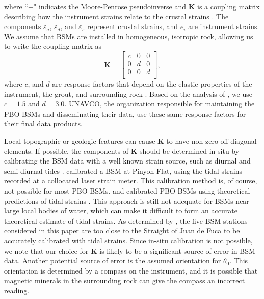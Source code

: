 where ``$+$" indicates the Moore-Penrose pseudoinverse and
$\mathbf{K}$ is a coupling matrix describing how the instrument
strains relate to the crustal strains \citep{Hart1996}. The components
$\varepsilon_a$, $\varepsilon_d$, and $\varepsilon_s$ represent
crustal strains, and $e_i$ are instrument strains. We assume that BSMs
are installed in homogeneous, isotropic rock, allowing us to write the
coupling matrix as
\begin{equation}\label{eq:CouplingMatrix}
\mathbf{K} = 
\left[\begin{array}{ccc}
c & 0 & 0 \\
0 & d & 0 \\
0 & 0 & d \\
\end{array}\right],
\end{equation}  
where $c$, and $d$ are response factors that depend on the elastic
properties of the instrument, the grout, and surrounding rock
\citep{Gladwin1985}. Based on the analysis of \citet{Gladwin1985}, we
use $c=1.5$ and $d=3.0$. UNAVCO, the organization responsible for
maintaining the PBO BSMs and disseminating their data, use these same
response factors for their final data products.

Local topographic or geologic features can cause $\mathbf{K}$ to have
non-zero off diagonal elements. If possible, the components of
$\mathbf{K}$ should be determined in-situ by calibrating the BSM data
with a well known strain source, such as diurnal and semi-diurnal
tides \citep{Hart1996,Roeloffs2010,Hodgkinson2013}. \citet{Hart1996}
calibrated a BSM at Pinyon Flat, using the tidal strains recorded at a
collocated laser strain meter. This calibration method is, of course,
not possible for most PBO BSMs. \citet{Roeloffs2010} and
\citet{Hodgkinson2013} calibrated PBO BSMs using theoretical
predictions of tidal strains \citep[e.g.,][]{Agnew1997}. This approach
is still not adequate for BSMs near large local bodies of water, which
can make it difficult to form an accurate theoretical estimate of
tidal strains. As determined by \citet{Roeloffs2010}, the five BSM
stations considered in this paper are too close to the Straight of
Juan de Fuca to be accurately calibrated with tidal strains. Since
in-situ calibration is not possible, we note that our choice for
$\mathbf{K}$ is likely to be a significant source of error in BSM
data. Another potential source of error is the assumed orientation for
$\theta_0$. This orientation is determined by a compass on the
instrument, and it is possible that magnetic minerals in the
surrounding rock can give the compass an incorrect reading.

